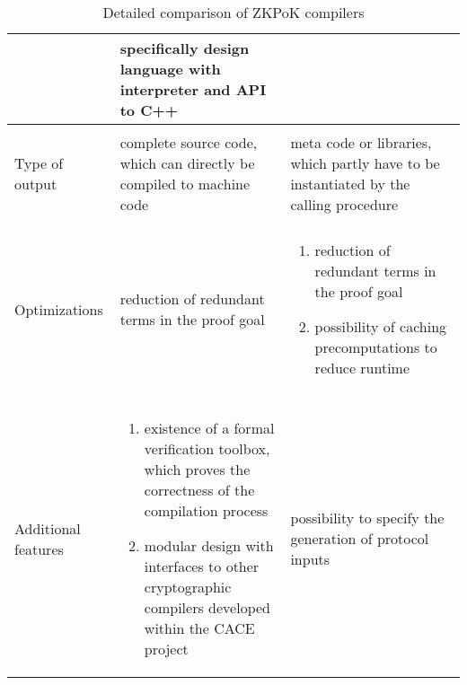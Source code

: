 \begin{table}[hbt!]
\begin{tabularx}{0.33\textwidth}{|l|l|l|}
    &
    \begin{minipage}{0.33\linewidth}
      specifically design language with interpreter and API to C++
    \end{minipage} \\
    \hline \\
    Type of output &
    \begin{minipage}{0.33\linewidth}
      complete source code, which can directly be compiled to machine
      code
    \end{minipage}
    &
    \begin{minipage}{0.33\linewidth}
      meta code or libraries, which partly have to be instantiated by
      the calling procedure
    \end{minipage} \\
    \hline \\
    Optimizations &
    \begin{minipage}{0.33\linewidth}
      reduction of redundant terms in the proof goal
    \end{minipage}
    &
    \begin{minipage}{0.33\linewidth}
      \begin{enumerate}
      \item reduction of redundant terms in the proof goal
      \item possibility of caching precomputations to reduce runtime
      \end{enumerate}
    \end{minipage} \\
    \hline \\
    Additional features &
    \begin{minipage}{0.33\linewidth}
      \begin{enumerate}
      \item existence of a formal verification toolbox, which proves
        the correctness of the compilation process
      \item modular design with interfaces to other cryptographic
        compilers developed within the CACE project
      \end{enumerate}
    \end{minipage}
    &
    \begin{minipage}{0.33\linewidth}
      possibility to specify the generation of protocol inputs
    \end{minipage}
  \end{tabularx}
  \caption{Detailed comparison of ZKPoK compilers \cite{yaczk}}
  \label{tab:compiler_comparison}
\end{table}

